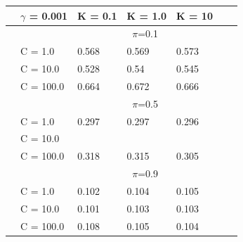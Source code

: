 \documentclass[english]{report}
\begin{document}
\begin{table}[H]
    \centering
    
    \begin{tabular}{ll|lllll}
        \hline
                                & \textbf{$\gamma$ = 0.001} &         K = 0.1 & K = 1.0 & K = 10 \\ \hline
                                & & \multicolumn{3}{c}{$\pi$=0.1} \\ \hline
                                & C = 1.0    & 0.568 & 0.569 & 0.573    \\
                                & C = 10.0   & 0.528 & 0.54 & 0.545  \\
                                & C = 100.0   & 0.664 & 0.672 & 0.666  \\ \hline

                                & & \multicolumn{3}{c}{$\pi$=0.5} \\ \hline
                                & C = 1.0    & 0.297 & 0.297 & 0.296    \\
                                & C = 10.0   & \color{red}{0.281} & \color{red}{0.29} & \color{red}{0.294}  \\
                                & C = 100.0   & 0.318 & 0.315 & 0.305  \\ \hline

                                & & \multicolumn{3}{c}{$\pi$=0.9} \\ \hline
                                & C = 1.0    & 0.102 & 0.104 & 0.105    \\
                                & C = 10.0   & 0.101 & 0.103 & 0.103  \\
                                & C = 100.0   & 0.108 & 0.105 & 0.104  \\ 
    \hline
    \end{tabular}
\end{table}
\end{document}
